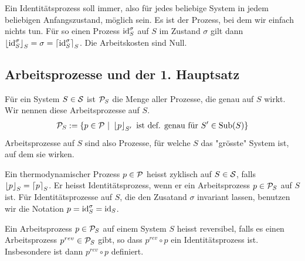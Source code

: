 \begin{definition}[Identitätsprozess]
    Ein Identitätsprozess soll immer, also für jedes beliebige System in
    jedem beliebigen Anfangszustand, möglich sein. Es ist der Prozess, bei
    dem wir einfach nichts tun. Für so einen Prozess $\id_S^\sigma$ auf $S$
    im Zustand $\sigma$ gilt dann $\floor{\id_S^\sigma}_S = \sigma =
    \ceil{\id_S^\sigma}_S$. Die Arbeitskosten sind Null.
\end{definition}


\subsection{Arbeitsprozesse und der 1. Hauptsatz}

\begin{definition}
    Für ein System $S \in \S$ ist $\P_S$ die Menge aller Prozesse, die
    genau auf $S$ wirkt. Wir nennen diese Arbeitsprozesse auf $S$.
    \begin{align*}
        \P_S := \geschwungeneklammer{p \in \P \ | \ \floor{p}_{S'} \text{ ist def. genau für $S' \in \text{Sub}(S)$}}
    \end{align*}
    Arbeitsprozesse auf $S$ sind also Prozesse, für welche $S$ das "grösste"
    System ist, auf dem sie wirken.
\end{definition}

\begin{definition}
    Ein thermodynamischer Prozess $p \in \P$ heisst zyklisch auf $S \in \S$,
    falls $\floor{p}_S = \ceil{p}_S$. Er heisst Identitätsprozess, wenn er
    ein Arbeitsprozess $p \in \P_S$ auf $S$ ist. Für Identitätsprozesse auf
    $S$, die den Zusatand $\sigma$ invariant lassen, benutzen wir die Notation
    $p = \id_S^\sigma = \id_S$. 
\end{definition}

\begin{definition}
    Ein Arbeitsprozess $p \in \P_S$ auf einem System $S$ heisst reversibel,
    falls es einen Arbeitsprozess $p^{rev} \in \P_S$ gibt, so dass
    $p^{rev} \circ p$ ein Identitätsprozess ist. Insbesondere ist dann
    $p^{rev} \circ p$ definiert.
\end{definition}

